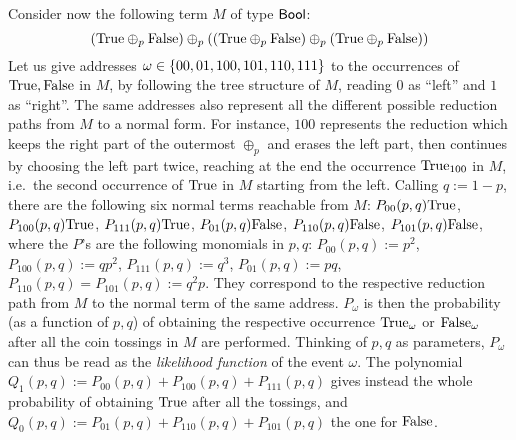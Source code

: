 Consider now the following term $M$ of type $\mathsf{Bool}$:
\[
 (\mathrm{True} \oplus_p\mathrm{False})\oplus_p((\mathrm{True}\oplus_p\mathrm{False})\oplus_p(\mathrm{True}\oplus_p\mathrm{False}))
\]
Let us give addresses $\omega\in\{00,01,100,101,110,111\}$ to the occurrences of $\mathrm{True},\mathrm{False}$ in $M$, by following the tree structure of $M$, reading $0$ as ``left'' and $1$ as ``right''.
The same addresses also represent all the different possible reduction paths from $M$ to a normal form.
For instance, $100$ represents the reduction which keeps the right part of the outermost $\oplus_p$ and erases the left part, then continues by choosing the left part twice, reaching at the end the occurrence $\mathrm{True}_{100}$ in $M$, i.e.\ the second occurrence of $\mathrm{True}$ in $M$ starting from the left.
Calling $q:=1-p$, there are the following six normal terms reachable from $M$:
$P_{00}(p,q)\mathrm{True}$, 
$P_{100}(p,q)\mathrm{True}$, 
$P_{111}(p,q)\mathrm{True}$, 
$P_{01}(p,q)\mathrm{False}$, 
$P_{110}(p,q)\mathrm{False}$,
$P_{101}(p,q)\mathrm{False}$,
where the $P$'s are the following monomials in $p,q$:
$P_{00}(p,q):=p^2$,
$P_{100}(p,q):=qp^2$,
$P_{111}(p,q):=q^3$,
$P_{01}(p,q):=pq$,
$P_{110}(p,q)=P_{101}(p,q):=q^2p$.
They correspond to the respective reduction path from $M$ to the normal term of the same address.
$P_{\omega}$ is then the probability (as a function of $p,q$) of obtaining the respective occurrence $\mathrm{True}_{\omega}$ or $\mathrm{False}_\omega$ after all the coin tossings in $M$ are performed.
Thinking of $p,q$ as parameters, $P_{\omega}$ can thus be read as the \emph{likelihood function} of the event $\omega$.
The polynomial $Q_{1}(p,q):=P_{00}(p,q)+P_{100}(p,q)+P_{111}(p,q)$ gives instead the whole probability of obtaining $\mathrm{True}$ after all the tossings, and $Q_{0}(p,q):=P_{01}(p,q)+P_{110}(p,q)+P_{101}(p,q)$ the one for $\mathrm{False}$.


